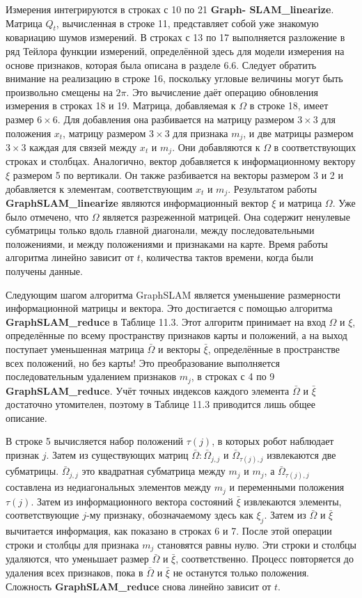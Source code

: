 \documentclass[10pt,a4paper]{article}
\begin{document}
Измерения интегрируются в строках с 10 по 21 \textbf{Graph- SLAM\_linearize}. Матрица $Q_t$, вычисленная в строке 11, представляет собой уже знакомую ковариацию шумов измерений. В строках с 13 по 17 выполняется разложение в ряд Тейлора функции измерений, определённой здесь для модели измерения на основе признаков, которая была описана в разделе 6.6. Следует обратить внимание на реализацию в строке 16, поскольку угловые величины могут быть произвольно смещены на $2\pi$. Это вычисление даёт операцию обновления измерения в строках 18 и 19. Матрица, добавляемая к $\varOmega$ в строке 18, имеет размер $6\times6$. Для добавления она разбивается на матрицу размером $3\times3$ для положения $x_t$, матрицу размером $3\times3$ для признака $m_j$, и две матрицы размером $3\times3$ каждая для связей между $x_t$ и $m_j$. Они добавляются к $\varOmega$ в соответствующих строках и столбцах. Аналогично, вектор добавляется к информационному вектору $\xi$ размером 5 по вертикали. Он также разбивается на векторы размером 3 и 2 и добавляется к элементам, соответствующим $x_t$ и $m_j$. Результатом работы \textbf{GraphSLAM\_linearize} являются информационный вектор $\xi$ и матрица $\varOmega$. Уже было отмечено, что $\varOmega$ является разреженной матрицей. Она содержит ненулевые субматрицы только вдоль главной диагонали, между последовательными положениями, и между положениями и признаками на карте. Время работы алгоритма линейно зависит от $t$, количества тактов времени, когда были получены данные.

Следующим шагом алгоритма GraphSLAM является уменьшение размерности информационной матрицы и вектора. Это достигается с помощью алгоритма \textbf{GraphSLAM\_reduce} в Таблице 11.3. Этот алгоритм принимает на вход $\varOmega$ и $\xi$, определённые по всему пространству признаков карты и положений, а на выход поступает уменьшенная матрица $\bar{\varOmega}$ и векторы $\bar{\xi}$, определённые в пространстве всех положений, но без карты! Это преобразование выполняется последовательным удалением признаков $m_j$, в строках с 4 по 9 \textbf{GraphSLAM\_reduce}. Учёт точных индексов каждого элемента $\bar{\varOmega}$  и $\bar{\xi}$ достаточно утомителен, поэтому в Таблице 11.3 приводится лишь общее описание.

В строке 5 вычисляется набор положений $\tau(j)$, в которых робот наблюдает признак $j$.  Затем  из существующих матриц $\bar{\varOmega}:\bar{\varOmega}_{j,j}$ и $\bar{\varOmega}_{\tau(j),j}$ извлекаются две субматрицы.  $\bar{\varOmega}_{j,j}$ это квадратная субматрица между $m_j$  и $m_j$, а $\bar{\varOmega}_{\tau(j),j}$  составлена из недиагональных элементов между $m_j$ и переменными положения $\tau(j)$. Затем из информационного вектора состояний $\bar{\xi}$ извлекаются элементы, соответствующие $j$-му признаку, обозначаемому здесь как $\xi_j.$ Затем из $\bar{\varOmega}$ и $\bar{\xi}$ вычитается информация, как показано в строках 6 и 7. После этой операции строки и столбцы для признака $m_j$ становятся равны нулю. Эти строки и столбцы удаляются, что уменьшает размер $\bar{\varOmega}$  и $\bar{\xi}$, соответственно.  Процесс повторяется до удаления всех признаков, пока в $\bar{\varOmega}$ и $\bar{\xi}$  не останутся только положения. Сложность \textbf{GraphSLAM\_reduce} снова линейно зависит от $t$.
\end{document}
